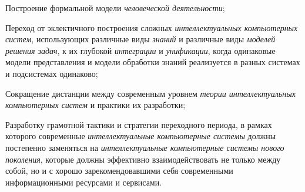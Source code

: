 \begin{textitemize}
	\item
	Построение формальной модели \textit{человеческой деятельности};
	\item
	Переход от эклектичного построения сложных \textit{интеллектуальных компьютерных систем}, использующих различные виды \textit{знаний} и различные виды \textit{моделей решения задач}, к их глубокой \textit{интеграции} и \textit{унификации}, когда одинаковые модели представления и модели обработки знаний реализуется в разных системах и подсистемах одинаково;
	\item
	Сокращение дистанции между современным уровнем \textit{теории интеллектуальных компьютерных систем} и практики их разработки;
	\item
	Разработку грамотной тактики и стратегии переходного периода, в рамках которого современные \textit{интеллектуальные компьютерные системы} должны постепенно заменяться на \textit{интеллектуальные компьютерные системы нового поколения}, которые должны эффективно взаимодействовать не только между собой, но и с хорошо зарекомендовавшими себя современными информационными ресурсами и сервисами.
\end{textitemize}

%